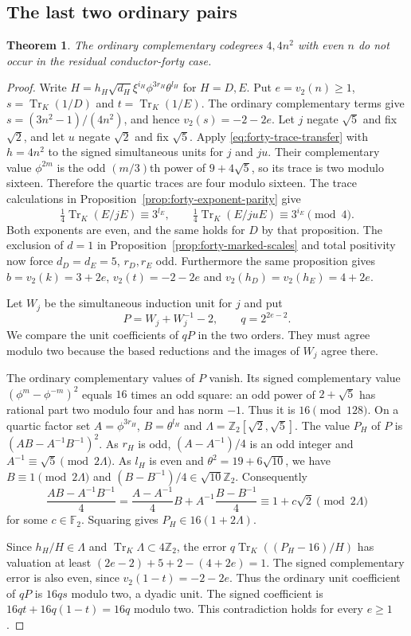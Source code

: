 \documentclass[11pt,reqno]{amsart}
\newtheorem{theorem}{Theorem}[section]
\theoremstyle{remark}\newtheorem{remark}[theorem]{Remark}
\numberwithin{equation}{section}
\begin{document}
\subsection{The last two ordinary pairs}

\begin{theorem}\label{thm:forty-even-excluded}
The ordinary complementary codegrees $4,4n^2$ with even $n$ do not
occur in the residual conductor-forty case.
\end{theorem}
\begin{proof}
Write $H=h_H\sqrt{d_H}\xi^{i_H}\phi^{3r_H}\theta^{l_H}$
for $H=D,E$. Put $e=v_2(n)\ge1$, $s=\operatorname{Tr}_K(1/D)$
and $t=\operatorname{Tr}_K(1/E)$. The ordinary complementary terms
give $s=(3n^2-1)/(4n^2)$, and hence $v_2(s)=-2-2e$.
Let $j$ negate $\sqrt5$ and fix $\sqrt2$, and let $u$ negate
$\sqrt2$ and fix $\sqrt5$. Apply \eqref{eq:forty-trace-transfer} with $h=4n^2$ to the signed simultaneous
units for $j$ and $ju$. Their complementary value $\phi^{2m}$ is the
odd $(m/3)$th power of $9+4\sqrt5$, so its trace is two modulo
sixteen. Therefore the quartic traces are four modulo sixteen.
The trace calculations in Proposition~\ref{prop:forty-exponent-parity}
give
\[
 \tfrac14\operatorname{Tr}_K(E/jE)\equiv3^{l_E},\qquad
 \tfrac14\operatorname{Tr}_K(E/juE)\equiv3^{i_E}\pmod4.
\]
Both exponents are even, and the same holds for $D$ by that proposition.
The exclusion of $d=1$ in Proposition~\ref{prop:forty-marked-scales}
and total positivity now force $d_D=d_E=5$, $r_D,r_E$ odd. Furthermore
the same proposition gives $b=v_2(k)=3+2e$, $v_2(t)=-2-2e$ and
$v_2(h_D)=v_2(h_E)=4+2e$.

Let $W_j$ be the simultaneous induction unit for $j$ and put
\[
       P=W_j+W_j^{-1}-2,\qquad q=2^{2e-2}.
\]
We compare the unit coefficients of $qP$ in the two orders. They must
agree modulo two because the based reductions and the images of
$W_j$ agree there.

The ordinary complementary values of $P$ vanish. Its signed
complementary value $(\phi^m-\phi^{-m})^2$ equals $16$ times an
odd square: an odd power of $2+\sqrt5$ has rational part two
modulo four and has norm $-1$. Thus it is $16\pmod{128}$.
On a quartic factor set $A=\phi^{3r_H}$, $B=\theta^{l_H}$ and
$\Lambda=\mathbb Z_2[\sqrt2,\sqrt5]$. The value $P_H$ of $P$
is $(AB-A^{-1}B^{-1})^2$. As $r_H$ is odd, $(A-A^{-1})/4$
is an odd integer and $A^{-1}\equiv\sqrt5\pmod{2\Lambda}$.
As $l_H$ is even and $\theta^2=19+6\sqrt{10}$, we have
$B\equiv1\pmod{2\Lambda}$ and $(B-B^{-1})/4\in\sqrt{10}\mathbb Z_2$.
Consequently
\[
 \frac{AB-A^{-1}B^{-1}}4
   =\frac{A-A^{-1}}4 B+A^{-1}\frac{B-B^{-1}}4
     \equiv 1+c\sqrt2\pmod{2\Lambda}
\]
for some $c\in\mathbb F_2$. Squaring gives $P_H\in16(1+2\Lambda)$.

Since $h_H/H\in\Lambda$ and $\operatorname{Tr}_K\Lambda\subset4\mathbb Z_2$,
the error $q\operatorname{Tr}_K((P_H-16)/H)$ has valuation at least
$(2e-2)+5+2-(4+2e)=1$. The signed complementary error is also even,
since $v_2(1-t)=-2-2e$. Thus the ordinary unit coefficient of $qP$
is $16qs$ modulo two, a dyadic unit. The signed
coefficient is $16qt+16q(1-t)=16q$ modulo two. This contradiction
holds for every $e\ge1$.
\end{proof}
\end{document}
